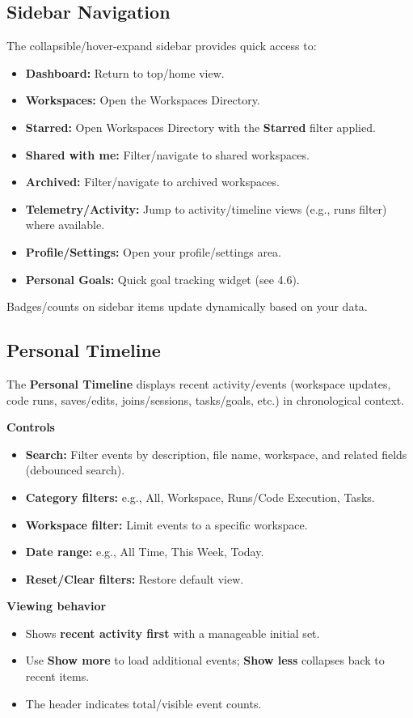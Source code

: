 \documentclass[11pt,a4paper]{article}
\begin{document}
\subsection{Sidebar Navigation}
The collapsible/hover-expand sidebar provides quick access to:
\begin{itemize}
  \item \textbf{Dashboard:} Return to top/home view.
  \item \textbf{Workspaces:} Open the Workspaces Directory.
  \item \textbf{Starred:} Open Workspaces Directory with the \textbf{Starred} filter applied.
  \item \textbf{Shared with me:} Filter/navigate to shared workspaces.
  \item \textbf{Archived:} Filter/navigate to archived workspaces.
  \item \textbf{Telemetry/Activity:} Jump to activity/timeline views (e.g., runs filter) where available.
  \item \textbf{Profile/Settings:} Open your profile/settings area.
  \item \textbf{Personal Goals:} Quick goal tracking widget (see 4.6).
\end{itemize}

Badges/counts on sidebar items update dynamically based on your data.

\subsection{Personal Timeline}
The \textbf{Personal Timeline} displays recent activity/events (workspace updates, code runs, saves/edits, joins/sessions, tasks/goals, etc.) in chronological context.

\textbf{Controls}
\begin{itemize}
  \item \textbf{Search:} Filter events by description, file name, workspace, and related fields (debounced search).
  \item \textbf{Category filters:} e.g., All, Workspace, Runs/Code Execution, Tasks.
  \item \textbf{Workspace filter:} Limit events to a specific workspace.
  \item \textbf{Date range:} e.g., All Time, This Week, Today.
  \item \textbf{Reset/Clear filters:} Restore default view.
\end{itemize}

\textbf{Viewing behavior}
\begin{itemize}
  \item Shows \textbf{recent activity first} with a manageable initial set.
  \item Use \textbf{Show more} to load additional events; \textbf{Show less} collapses back to recent items.
  \item The header indicates total/visible event counts.
\end{itemize}
\end{document}
